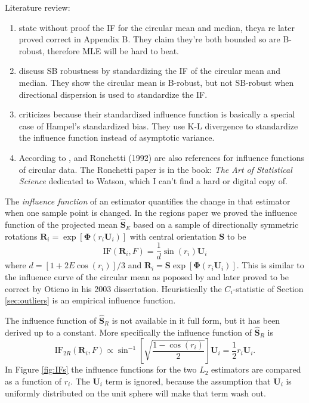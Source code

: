 \documentclass{article}\usepackage[]{graphicx}\usepackage[]{color}
\newcommand{\ProjMean}{{\widehat{\bm S}_{E}}}
\newcommand{\GeomMean}{{\widehat{\bm S}_{R}}}
\begin{document}
Literature review:
\begin{enumerate}
\item \cite{wehrly1981} state without proof the IF for the circular mean and median, theya re later proved correct in \cite{otieno2002} Appendix B.  They claim they're both bounded so are B-robust, therefore MLE will be hard to beat.
\item \cite{ko1988} discuss SB robustness by standardizing the IF of the circular mean and median.  They show the circular mean is B-robust, but not SB-robust when directional dispersion is used to standardize the IF.
\item \cite{he1992} criticizes \cite{ko1988} because their standardized influence function is basically a special case of Hampel's standardized bias.  They use K-L divergence to standardize the influence function instead of asymptotic variance.

\item According to \cite{agostinelli2007}, \cite{ko1992} and Ronchetti (1992) are also references for influence functions of circular data.  The Ronchetti paper is in the book: {\it The Art of Statistical Science} dedicated to Watson, which I can't find a hard or digital copy of.
\end{enumerate}

The \emph{influence function} of an estimator quantifies the change in that estimator when one sample point is changed.  In the regions paper we proved the influence function of the projected mean $\ProjMean$ based on a sample of directionally symmetric rotations $\bm R_i=\exp[\bm \Phi(r_i\bm U_i)]$ with central orientation $\bm S$ to be
\begin{equation}\label{eqn:IF}
\text{IF}(\bm R_i,F)=\frac{1}{d}\sin(r_i)\bm U_i
\end{equation}
where $d=[1+2E\cos(r_i)]/3$ and $\bm R_i=\bm S\exp[\bm\Phi(r_i\bm U_i)]$.  This is similar to the influence curve of the circular mean as poposed by \cite{wehrly1981} and later proved to be correct by Otieno in his 2003 dissertation.  Heuristically the $C_i$-statistic of Section \ref{sec:outliers} is an empirical influence function.  

The influence function of $\GeomMean$ is not available in it full form, but it has been derived up to a constant.  More specifically the influence function of $\GeomMean$ is
\[
\text{IF}_{2R}(\bm R_i,F)\propto\sin^{-1}\left[\sqrt{\frac{1-\cos(r_i)}{2}}\right]\bm U_i= \frac{1}{2}r_i\bm U_i.
\]
In Figure \ref{fig:IFs} the influence functions for the two $L_2$ estimators are compared as a function of $r_i$.  The $\bm U_i$ term is ignored, because the assumption that $\bm U_i$ is uniformly distributed on the unit sphere will make that term wash out.
 
\end{document}
